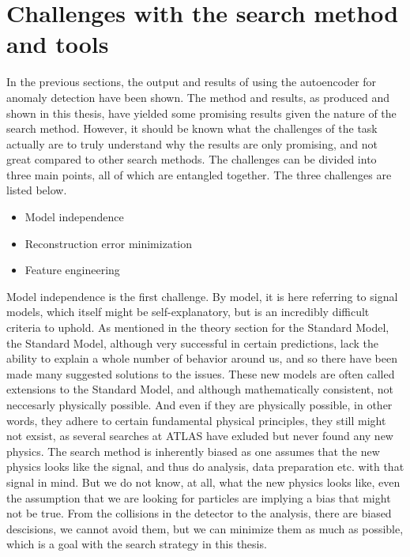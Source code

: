 \section{Challenges with the search method and tools}

In the previous sections, the output and results of using the autoencoder for anomaly detection have been shown. 
The method and results, as produced and shown in this thesis, have yielded some promising results given the nature 
of the search method. However, it should be known what the challenges of the task actually are to truly understand 
why the results are only promising, and not great compared to other search methods. The challenges can be divided into 
three main points, all of which are entangled together. The three challenges are listed below. 

\begin{itemize}
    \item Model independence
    \item Reconstruction error minimization
    \item Feature engineering
\end{itemize}

Model independence is the first challenge. By model, it is here referring to signal models, which itself might be self-explanatory, 
but is an incredibly difficult criteria to uphold. As mentioned in the theory section for the Standard Model, 
the Standard Model, although very successful in certain predictions, lack the ability to explain a whole number of 
behavior around us, and so there have been made many suggested solutions to the issues. These new models are 
often called extensions to the Standard Model, and although mathematically consistent, not neccesarly physically possible. 
And even if they are physically possible, in other words, they adhere to certain fundamental physical principles, they 
still might not exsist, as several searches at ATLAS have exluded but never found any new physics. The search method is inherently 
biased as one assumes that the new physics looks like the signal, and thus do analysis, data preparation etc. with that 
signal in mind. But we do not know, at all, what the new physics looks like, even the assumption that we are looking for 
particles are implying a bias that might not be true. From the collisions in the detector to the analysis, there are biased descisions, 
we cannot avoid them, but we can minimize them as much as possible, which is a goal with the search strategy in this thesis. \par

